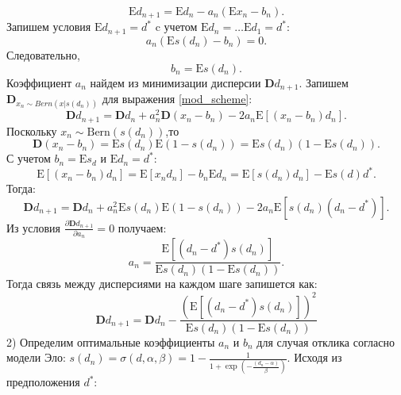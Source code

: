 \begin{equation}
    \mathrm{E} d_{n+1} = \mathrm{E} d_n -  a_n(\mathrm{E}x_n-b_n).
\end{equation}
Запишем условия $\mathrm{E} d_{n+1} = d^*$ c учетом $\mathrm{E} d_{n} = \dots \mathrm{E} d_{1}= d^*$:
\begin{equation}
    a_n (\mathrm{E} s(d_n) - b_n)  =0.
\end{equation}
Следовательно,
\begin{equation}
    \label{b_n}
    b_n = \mathrm{E} s(d_n).
\end{equation}
Коэффициент $a_n$ найдем из минимизации дисперсии $\mathbf{D} d_{n+1}$. Запишем $\mathbf{D}_{x_n \sim Bern(x | s(d_n))}$ для выражения \ref{mod_scheme}:
\begin{equation}
    \label{disp}
    \mathbf{D} d_{n+1} = \mathbf{D} d_n + a_n^2 \mathbf{D} (x_n-b_n)  - 2 a_n \mathrm{E}\left[(x_n-b_n)d_n\right].
\end{equation}
Поскольку $x_n \sim \text{Bern}(s(d_n))$,то
\begin{equation}
    \mathbf{D}(x_n-b_n) = \mathrm{E} s(d_n) \mathrm{E} (1-s(d_n))=  \mathrm{E} s(d_n)  (1-\mathrm{E}s(d_n)).
\end{equation}
С учетом $b_n = \mathrm{E} s_d$ и $\mathrm{E} d_n =d^*$:
\begin{equation}
    \mathrm{E}\left[(x_n-b_n)d_n\right] = \mathrm{E}\left[x_n d_n \right] - b_n  \mathrm{E} d_n = \mathrm{E} \left[s(d_n) d_n\right] - \mathrm{E} s(d) d^*.
\end{equation}
Тогда:
\begin{equation}
    \mathbf{D} d_{n+1} = \mathbf{D} d_n + a_n^2 \mathrm{E}s(d_n)\mathrm{E}(1-s(d_n)) - 2 a_n \mathrm{E}\left[ s(d_n) (d_n-d^*)\right].
\end{equation}
Из условия $\frac{\partial \mathbf{D}{d_{n+1}}}{\partial a_n} =0 $ получаем:
\begin{equation}
    \label{diff}
    a_n = \frac{\mathrm{E} \left[ (d_n-d^*) s(d_n)\right]}{\mathrm{E}s(d_n)(1 - \mathrm{E}s(d_n))}.
\end{equation}
Тогда связь между дисперсиями на каждом шаге запишется как:
\begin{equation}
    \mathbf{D} d_{n+1} = \mathbf{D} d_n - \frac{\left(\mathrm{E} \left[ (d_n-d^*) s(d_n)\right] \right)^2}{\mathrm{E}s(d_n)(1 - \mathrm{E}s(d_n))} 
\end{equation}
2) Определим оптимальные коэффициенты $a_n$ и $b_n$ для случая отклика согласно модели Эло: $s(d_n) = \sigma(d,\alpha,\beta) = 1 - \frac{1}{1+\exp(-\frac{(d_n-\alpha)}{\beta})}$. Исходя из предположения $d^*$:

